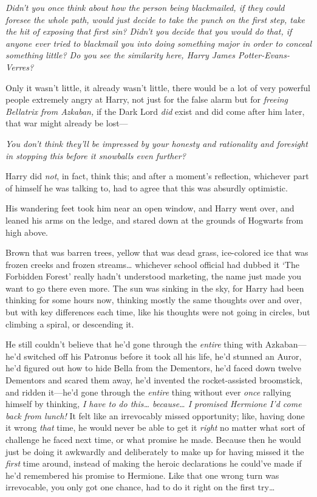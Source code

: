 \emph{Didn't you once think about how the person being blackmailed, if they 
could foresee the whole path, would just decide to take the punch on the first 
step, take the hit of exposing that first sin? Didn't you decide that you would 
do that, if anyone ever tried to blackmail you into doing something major in 
order to conceal something little? Do you see the similarity here, Harry James 
Potter-Evans-Verres?}

Only it wasn't little, it already wasn't little, there would be a lot of very 
powerful people extremely angry at Harry, not just for the false alarm but for 
\emph{freeing Bellatrix from Azkaban,} if the Dark Lord \emph{did} exist and 
did come after him later, that war might already be lost---

\emph{You don't think they'll be impressed by your honesty and rationality and 
foresight in stopping this before it snowballs even further?}

Harry did \emph{not}, in fact, think this; and after a moment's reflection, 
whichever part of himself he was talking to, had to agree that this was 
absurdly optimistic.

His wandering feet took him near an open window, and Harry went over, and 
leaned his arms on the ledge, and stared down at the grounds of Hogwarts from 
high above.

Brown that was barren trees, yellow that was dead grass, ice-colored ice that 
was frozen creeks and frozen streams{\ldots} whichever school official had 
dubbed it `The Forbidden Forest' really hadn't understood marketing, the name 
just made you want to go there even more. The sun was sinking in the sky, for 
Harry had been thinking for some hours now, thinking mostly the same thoughts 
over and over, but with key differences each time, like his thoughts were not 
going in circles, but climbing a spiral, or descending it.

He still couldn't believe that he'd gone through the \emph{entire} thing with 
Azkaban---he'd switched off his Patronus before it took all his life, he'd 
stunned an Auror, he'd figured out how to hide Bella from the Dementors, he'd 
faced down twelve Dementors and scared them away, he'd invented the 
rocket-assisted broomstick, and ridden it---he'd gone through the \emph{entire} 
thing without ever \emph{once} rallying himself by thinking, \emph{I have to do 
this{\ldots} because{\ldots} I promised Hermione I'd come back from lunch!} It 
felt like an irrevocably missed opportunity; like, having done it wrong 
\emph{that} time, he would never be able to get it \emph{right} no matter what 
sort of challenge he faced next time, or what promise he made. Because then he 
would just be doing it awkwardly and deliberately to make up for having missed 
it the \emph{first} time around, instead of making the heroic declarations he 
could've made if he'd remembered his promise to Hermione. Like that one wrong 
turn was irrevocable, you only got one chance, had to do it right on the first 
try{\ldots}

